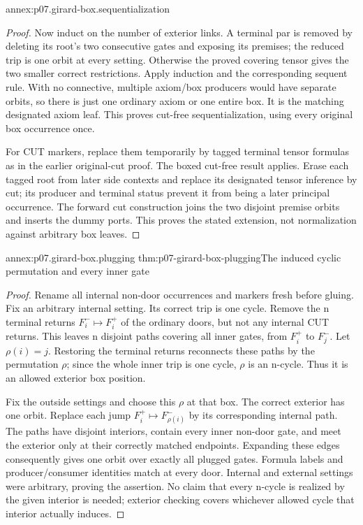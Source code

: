 \begin{annexitem}{annex:p07.girard-box.sequentialization}
\begin{proof}
Now induct on the number of exterior links. A terminal par is removed
by deleting its root's two consecutive gates and exposing its premises;
the reduced trip is one orbit at every setting. Otherwise the proved
covering tensor gives the two smaller correct restrictions.
Apply induction and the corresponding sequent rule.
With no connective, multiple axiom/box producers would have separate
orbits, so there is just one ordinary axiom or one entire box.
It is the matching designated axiom leaf. This proves cut-free
sequentialization, using every original box occurrence once.

For CUT markers, replace them temporarily by tagged terminal tensor
formulas as in the earlier original-cut proof. The boxed cut-free
result applies. Erase each tagged root from later side contexts and
replace its designated tensor inference by cut; its producer and
terminal status prevent it from being a later principal occurrence.
The forward cut construction joins the two disjoint premise orbits
and inserts the dummy ports. This proves the stated extension, not
normalization against arbitrary box leaves.
\end{proof}
\end{annexitem}

\begin{annexitem}{annex:p07.girard-box.plugging}
 {thm:p07-girard-box-plugging}{The induced cyclic permutation and every inner gate}
\begin{proof}
Rename all internal non-door occurrences and markers fresh before gluing.
Fix an arbitrary internal setting. Its correct trip is one cycle.
Remove the n terminal returns \(F_i^-\mapsto F_i^+\) of the
ordinary doors, but not any internal CUT returns.
This leaves n disjoint paths covering all inner gates, from \(F_i^+\)
to \(F_j^-\). Let \(\rho(i)=j\).
Restoring the terminal returns reconnects these paths by the permutation
\(\rho\); since the whole inner trip is one cycle, \(\rho\) is an
n-cycle. Thus it is an allowed exterior box position.

Fix the outside settings and choose this \(\rho\) at that box.
The correct exterior has one orbit. Replace each jump
\(F_i^+\mapsto F_{\rho(i)}^-\) by its corresponding internal path.
The paths have disjoint interiors, contain every inner non-door gate,
and meet the exterior only at their correctly matched endpoints.
Expanding these edges consequently gives one orbit over exactly all
plugged gates. Formula labels and producer/consumer identities match
at every door. Internal and external settings were arbitrary, proving
the assertion. No claim that every n-cycle is realized by the given
interior is needed; exterior checking covers whichever allowed cycle
that interior actually induces.
\end{proof}
\end{annexitem}

